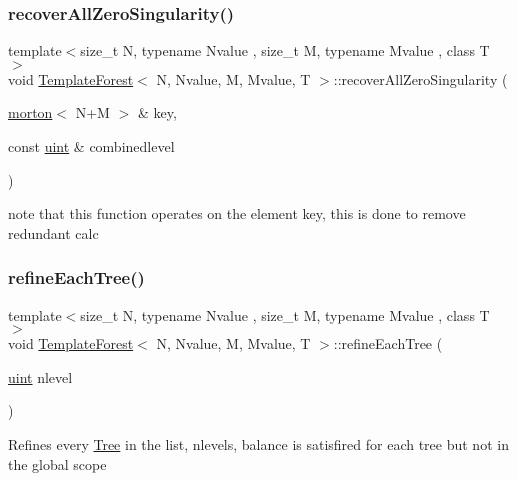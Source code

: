 \subsubsection{\texorpdfstring{recover\+All\+Zero\+Singularity()}{recoverAllZeroSingularity()}}
{\footnotesize\ttfamily template$<$size\+\_\+t N, typename Nvalue , size\+\_\+t M, typename Mvalue , class T $>$ \\
void \mbox{\hyperlink{classTemplateForest}{Template\+Forest}}$<$ N, Nvalue, M, Mvalue, T $>$\+::recover\+All\+Zero\+Singularity (\begin{DoxyParamCaption}\item[{\mbox{\hyperlink{definitions_8h_af8682350bd8bb38ee9023f7a0a310add}{morton}}$<$ N+M $>$ \&}]{key,  }\item[{const \mbox{\hyperlink{definitions_8h_a69aa29b598b851b0640aa225a9e5d61d}{uint}} \&}]{combinedlevel }\end{DoxyParamCaption})}

note that this function operates on the element key, this is done to remove redundant calc \mbox{\label{classTemplateForest_a011af6d1e352dfb90e3e74daa2d34e36}} 
\subsubsection{\texorpdfstring{refine\+Each\+Tree()}{refineEachTree()}}
{\footnotesize\ttfamily template$<$size\+\_\+t N, typename Nvalue , size\+\_\+t M, typename Mvalue , class T $>$ \\
void \mbox{\hyperlink{classTemplateForest}{Template\+Forest}}$<$ N, Nvalue, M, Mvalue, T $>$\+::refine\+Each\+Tree (\begin{DoxyParamCaption}\item[{\mbox{\hyperlink{definitions_8h_a69aa29b598b851b0640aa225a9e5d61d}{uint}}}]{nlevel }\end{DoxyParamCaption})}

Refines every \mbox{\hyperlink{classTree}{Tree}} in the list, nlevels, balance is satisfired for each tree but not in the global scope \mbox{\label{classTemplateForest_a9d7144f8471d28d1412ab85363566a56}} 
